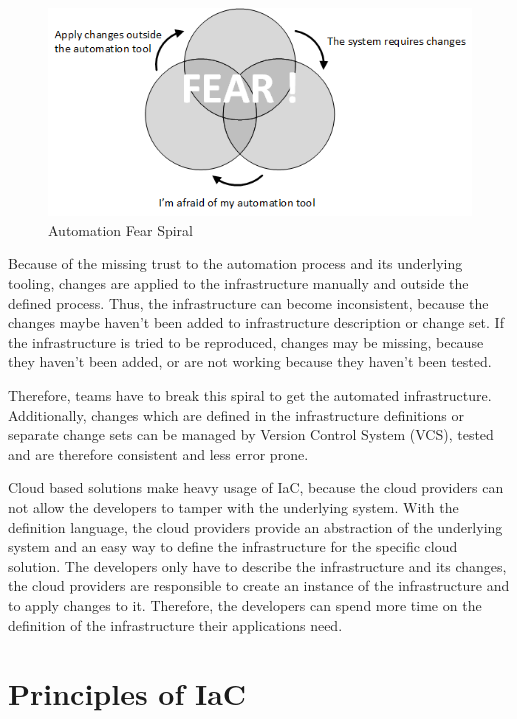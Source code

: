 \begin{figure}[htbp]
	\centering
	\includegraphics[scale=0.95]{images/automation-fear-spiral.png}
	\caption{Automation Fear Spiral}
	\label{fig:automation-fear-spiral}
\end{figure} 
Because of the missing trust to the automation process and its underlying tooling, changes are applied to the infrastructure manually and outside the defined process. Thus, the infrastructure can become inconsistent, because the changes maybe haven't been added to infrastructure description or change set. If the infrastructure is tried to be reproduced, changes may be missing, because they haven't been added, or are not working because they haven't been tested.

Therefore, teams have to break this spiral to get the automated infrastructure. Additionally, changes which are defined in the infrastructure definitions or separate change sets can be managed by Version Control System (VCS), tested and are therefore consistent and less error prone.

Cloud based solutions make heavy usage of IaC, because the cloud providers can not allow the developers to tamper with the underlying system. With the definition language, the cloud providers provide an abstraction of the underlying system and an easy way to define the infrastructure for the specific cloud solution. The developers only have to describe the infrastructure and its changes, the cloud providers are responsible to create an instance of the infrastructure and to apply changes to it. Therefore, the developers can spend more time on the definition of the infrastructure their applications need.

\section{Principles of IaC}
\label{sec:iac-principles}
